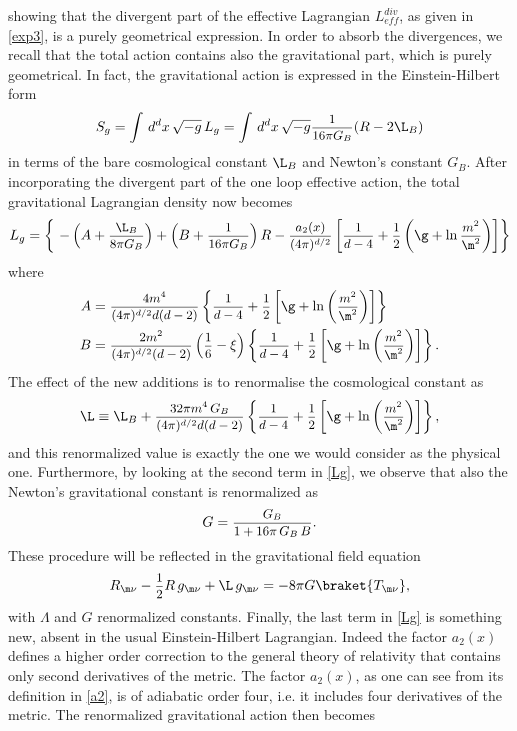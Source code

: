 \documentclass[a4paper,11pt,openright,twoside]{book}
\let\n=\nu      \let\x=\xi     \let\p=\pi      \let\r=\rho
\newcommand{\sdfrac}[2]{\mbox{\small$\displaystyle\frac{#1}{#2}$}}
\numberwithin{equation}{section}
\begin{document}
{{{	{ showing that the divergent part of the effective Lagrangian $L_{eff}^{div}$, as given in \eqref{exp3}, is a purely geometrical expression. In order to absorb the divergences, we recall that the total action contains also the gravitational part, which is purely geometrical. In fact, the gravitational action is expressed in the Einstein-Hilbert form 
		\begin{equation}
			S_g=\int\,d^dx\,\sqrt{-g}\,L_g=\int\,d^dx\,\sqrt{-g}\sdfrac{1}{16\pi G_B}(R-2\L_B)
		\end{equation}
		in terms of the bare cosmological constant $\L_B$ and Newton's constant $G_B$. After incorporating the divergent part of the one loop effective action, the total gravitational Lagrangian density now becomes
		\begin{equation}
			L_g=\left\{\ -\left(A+\sdfrac{\L_B}{8\pi G_B}\right)+\left(B+\sdfrac{1}{16\pi G_B}\right)R-\sdfrac{a_2(x)}{(4\pi)^{d/2}}\left[\sdfrac{1}{d-4}+\sdfrac{1}{2}\left(\g+\ln\sdfrac{m^2}{\m^2}\right)\right]\right\}\label{Lg}
		\end{equation}
		where
		\begin{align}
			A&=\sdfrac{4m^4}{(4\pi)^{d/2}d(d-2)}\left\{\sdfrac{1}{d-4}+\sdfrac{1}{2}\left[\g+\ln\left(\sdfrac{m^2}{\m^2}\right)\right]\right\}\\
			B&=\sdfrac{2m^2}{(4\pi)^{d/2}(d-2)}\left(\sdfrac{1}{6}-\x\right)\left\{\sdfrac{1}{d-4}+\sdfrac{1}{2}\left[\g+\ln\left(\sdfrac{m^2}{\m^2}\right)\right]\right\}.
		\end{align}
		The effect of the new additions is to renormalise the cosmological constant as
		\begin{equation}
			\L\equiv \L_B+\sdfrac{32\pi m^4\,G_B}{(4\pi)^{d/2}d(d-2)}\left\{\sdfrac{1}{d-4}+\sdfrac{1}{2}\left[\g+\ln\left(\sdfrac{m^2}{\m^2}\right)\right]\right\},\label{reno}
		\end{equation}
		and this renormalized value is exactly the one we would consider as the physical one. Furthermore, by looking at the second term in \eqref{Lg}, we observe that also the Newton's gravitational constant is renormalized as
		\begin{equation}
			G=\sdfrac{G_B}{1+16\pi\,G_B\,B}.
		\end{equation}
		These procedure will be reflected in the gravitational field equation 
		\begin{equation}
			R_{\m\n}-\sdfrac{1}{2}R\,g_{\m\n}+\L\,g_{\m\n}=-8\pi G\braket{T_{\m\n}},
		\end{equation}
		with $\Lambda$ and $G$ renormalized constants. Finally, the last term in \eqref{Lg} is something new, absent in the usual Einstein-Hilbert Lagrangian. Indeed the factor $a_2(x)$ defines a higher order correction to the general theory of relativity that contains only second derivatives of the metric. The factor $a_2(x)$, as one can see from its definition in \eqref{a2}, is of adiabatic order four, i.e. it includes four derivatives of the metric. The renormalized gravitational action then becomes
}}}}
\end{document}
